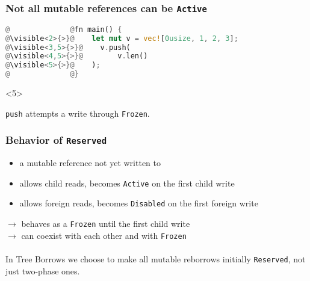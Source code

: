 \begin{frame}[fragile, t]
    \frametitle{Not all mutable references can be \texttt{Active}}
    \begin{block}{}
        \begin{lstlisting}[language=rust, escapechar=\@]
@              @fn main() {
@\visible<2>{>}@    let mut v = vec![0usize, 1, 2, 3];
@\visible<3,5>{>}@    v.push(
@\visible<4,5>{>}@        v.len()
@\visible<5>{>}@    );
@              @}
        \end{lstlisting}
    \end{block}
    \begin{block}{}
    \end{block}
    \begin{onlyenv}<5>
        \begin{block}{}
            \texttt{push} attempts a write through \texttt{Frozen}.
        \end{block}
    \end{onlyenv}
\end{frame}

\begin{frame}
    \frametitle{Behavior of \texttt{Reserved}}
    \begin{itemize}
        \item a mutable reference not yet written to
        \item allows child reads, becomes \texttt{Active} on the first child write
        \item allows foreign reads, becomes \texttt{Disabled} on the first foreign write
    \end{itemize}
    \(\to\) behaves as a \texttt{Frozen} until the first child write\\
    \(\to\) can coexist with each other and with \texttt{Frozen}\\

    ~\\
    In Tree Borrows we choose to make all mutable reborrows initially \texttt{Reserved},
    not just two-phase ones.
\end{frame}

